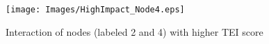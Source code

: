 \begin{figure}
	\texttt{[image: Images/HighImpact\_Node4.eps]}
	\caption{Interaction of nodes (labeled 2 and 4) with higher \ac{TEI} score}
	\label{fig:highImpactNode}
\end{figure}
